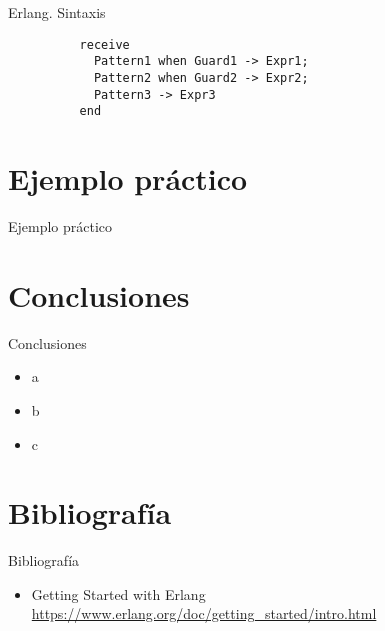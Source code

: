 \documentclass{beamer}
\begin{document}
      \begin{frame}[fragile]{Erlang. Sintaxis}
        \begin{verbatim}
          receive
            Pattern1 when Guard1 -> Expr1;
            Pattern2 when Guard2 -> Expr2;
            Pattern3 -> Expr3
          end
        \end{verbatim}
      \end{frame}

  \section{Ejemplo práctico}
    \begin{frame}{Ejemplo práctico}
    \end{frame}

  \section{Conclusiones}
    \begin{frame}{Conclusiones}
      \begin{itemize}
        \item a
        \item b
        \item c
      \end{itemize}
    \end{frame}

  \section{Bibliografía}
    \begin{frame}{Bibliografía}
      \begin{itemize}
        \item Getting Started with Erlang \url{https://www.erlang.org/doc/getting_started/intro.html}
      \end{itemize}
    \end{frame}
\end{document}
